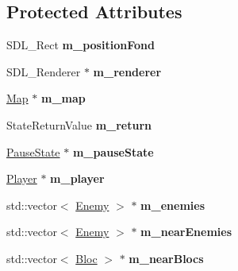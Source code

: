 \subsection*{Protected Attributes}
\begin{DoxyCompactItemize}
\item 
\mbox{\label{class_play_level_ab05cfa7b5cf1aa8b71ce6317925ac1e1}} 
S\+D\+L\+\_\+\+Rect {\bfseries m\+\_\+position\+Fond}
\item 
\mbox{\label{class_play_level_a192a8b05fb3597b858e5e3a97c4341b4}} 
S\+D\+L\+\_\+\+Renderer $\ast$ {\bfseries m\+\_\+renderer}
\item 
\mbox{\label{class_play_level_af10fd21bff561683ed2b927719a57c75}} 
\hyperlink{class_map}{Map} $\ast$ {\bfseries m\+\_\+map}
\item 
\mbox{\label{class_play_level_a26c881231a3ebb3ee4a78e126255fd25}} 
State\+Return\+Value {\bfseries m\+\_\+return}
\item 
\mbox{\label{class_play_level_a607732297288ab8803942d6189e565aa}} 
\hyperlink{class_pause_state}{Pause\+State} $\ast$ {\bfseries m\+\_\+pause\+State}
\item 
\mbox{\label{class_play_level_a5f70664bb443b2f15c72348ddc0a3831}} 
\hyperlink{class_player}{Player} $\ast$ {\bfseries m\+\_\+player}
\item 
\mbox{\label{class_play_level_ae9c19e8bec474ea226bda5a5a7221e3d}} 
std\+::vector$<$ \hyperlink{class_enemy}{Enemy} $>$ $\ast$ {\bfseries m\+\_\+enemies}
\item 
\mbox{\label{class_play_level_a8711c954740f0aa9f828841273bbfdcc}} 
std\+::vector$<$ \hyperlink{class_enemy}{Enemy} $>$ $\ast$ {\bfseries m\+\_\+near\+Enemies}
\item 
\mbox{\label{class_play_level_a9afd1e37b1e9682775788e67714670bb}} 
std\+::vector$<$ \hyperlink{class_bloc}{Bloc} $>$ $\ast$ {\bfseries m\+\_\+near\+Blocs}
\item 
\mbox{\label{class_play_level_a3c52ed1b58a5a5f78bd441a71f52b285}} 

\end{DoxyCompactItemize}
